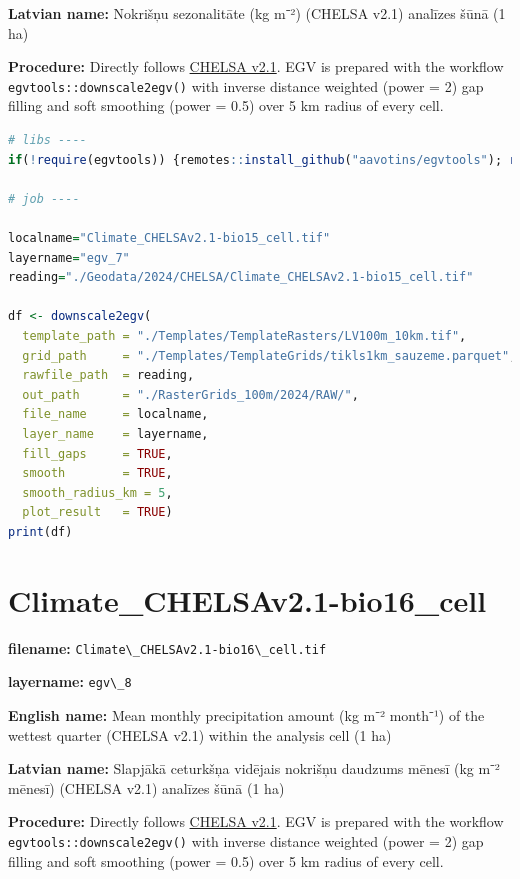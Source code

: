\documentclass[
]{book}
\newcommand{\passthrough}[1]{#1}
\begin{document}
\textbf{Latvian name:} Nokrišņu sezonalitāte (kg m⁻²) (CHELSA v2.1) analīzes šūnā (1 ha)

\textbf{Procedure:} Directly follows \hyperref[Ch04.11]{CHELSA v2.1}. EGV is prepared with the
workflow \passthrough{\lstinline!egvtools::downscale2egv()!} with inverse distance weighted (power = 2)
gap filling and soft smoothing (power = 0.5) over 5 km radius of every cell.

\begin{lstlisting}[language=R]
# libs ----
if(!require(egvtools)) {remotes::install_github("aavotins/egvtools"); require(egvtools)}

# job ----

localname="Climate_CHELSAv2.1-bio15_cell.tif"
layername="egv_7"
reading="./Geodata/2024/CHELSA/Climate_CHELSAv2.1-bio15_cell.tif"

df <- downscale2egv(
  template_path = "./Templates/TemplateRasters/LV100m_10km.tif",
  grid_path     = "./Templates/TemplateGrids/tikls1km_sauzeme.parquet",
  rawfile_path  = reading,
  out_path      = "./RasterGrids_100m/2024/RAW/",
  file_name     = localname,
  layer_name    = layername,
  fill_gaps     = TRUE,
  smooth        = TRUE,
  smooth_radius_km = 5,
  plot_result   = TRUE)
print(df)
\end{lstlisting}

\section{Climate\_CHELSAv2.1-bio16\_cell}\label{ch06.008}

\textbf{filename:} \passthrough{\lstinline!Climate\_CHELSAv2.1-bio16\_cell.tif!}

\textbf{layername:} \passthrough{\lstinline!egv\_8!}

\textbf{English name:} Mean monthly precipitation amount (kg m⁻² month⁻¹) of the wettest quarter (CHELSA v2.1) within the analysis cell (1 ha)

\textbf{Latvian name:} Slapjākā ceturkšņa vidējais nokrišņu daudzums mēnesī (kg m⁻² mēnesī) (CHELSA v2.1) analīzes šūnā (1 ha)

\textbf{Procedure:} Directly follows \hyperref[Ch04.11]{CHELSA v2.1}. EGV is prepared with the
workflow \passthrough{\lstinline!egvtools::downscale2egv()!} with inverse distance weighted (power = 2)
gap filling and soft smoothing (power = 0.5) over 5 km radius of every cell.
\end{document}
